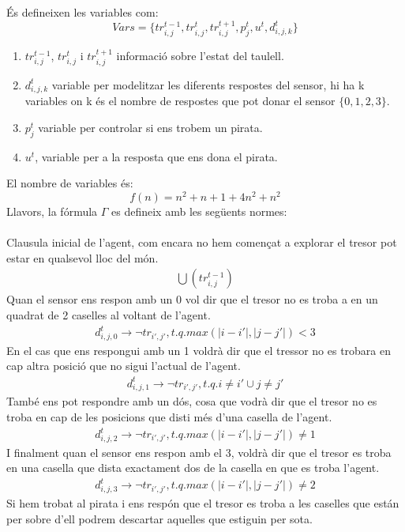 
És defineixen les variables com:
\[
Vars = \{tr^{t-1}_{i,j}, tr^{t}_{i,j}, tr^{t+1}_{i,j}, p_j^t, u^t, d_{i, j, k}^t\}
\]
\begin{enumerate}
	\item $tr^{t-1}_{i,j}$, $tr^{t}_{i,j}$ i $tr^{t+1}_{i,j}$ informació sobre l'estat del taulell. 
	\item $d_{i, j, k}^t$ variable per modelitzar les diferents respostes del sensor, hi ha k variables on k és el nombre de respostes que pot donar el sensor $\{0,1,2,3\}$.
	\item $p_j^t$ variable per controlar si ens trobem un pirata.
	\item $u^t$, variable per a la resposta que ens dona el pirata.
\end{enumerate}
El nombre de variables és:
\[
f(n) = n^2 + n + 1 + 4n^2 + n^2
\]
Llavors, la fórmula $\Gamma$ es defineix amb les següents normes:\\
\\
Clausula inicial de l'agent, com encara no hem començat a explorar el tresor pot estar en qualsevol lloc del món. 
\begin{gather}
\bigcup(tr_{i, j}^{t-1})
\end{gather}
Quan el sensor ens respon amb un 0 vol dir que el tresor no es troba a en un quadrat de 2 caselles al voltant de l'agent.
\begin{gather}
d_{i, j, 0}^t \rightarrow \neg tr_{i', j'}, t.q. max(|i - i'|, |j - j'|) < 3
\end{gather}
En el cas que ens respongui amb un 1 voldrà dir que el tressor no es trobara en cap altra posició que no sigui l'actual de l'agent.
\begin{gather}
d_{i, j, 1}^t \rightarrow \neg tr_{i', j'}, t.q. i \neq i' \cup j \neq j'
\end{gather}
També ens pot respondre amb un dós, cosa que vodrà dir que el tresor no es troba en cap de les posicions que disti més d'una casella de l'agent.
\begin{gather}
d_{i, j, 2}^t \rightarrow \neg tr_{i', j'}, t.q. max(|i - i'|, |j - j'|) \neq 1
\end{gather}
I finalment quan el sensor ens respon amb el 3, voldrà dir que el tresor es troba en una casella que dista exactament dos de la casella en que es troba l'agent.
\begin{gather}
d_{i, j, 3}^t \rightarrow \neg tr_{i', j'}, t.q. max(|i - i'|, |j - j'|) \neq 2
\end{gather}
Si hem trobat al pirata i ens respón que el tresor es troba a les caselles que están per sobre d'ell podrem descartar aquelles que estiguin per sota.
